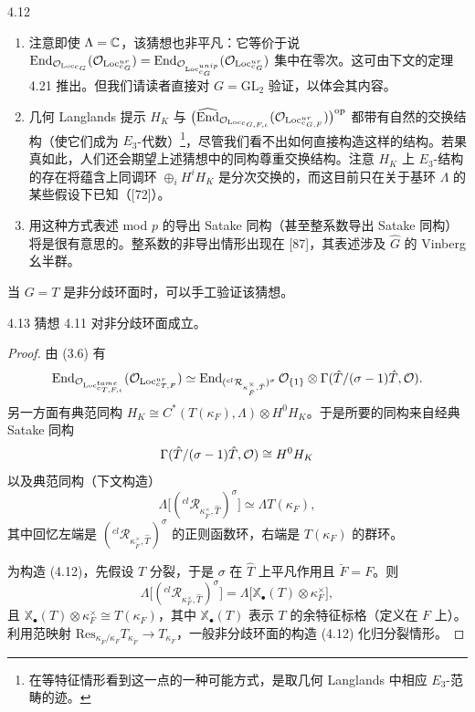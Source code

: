 \begin{rem}{4.12}
\begin{enumerate}[label=(\arabic*),leftmargin=1.8em,itemsep=0.15em]
\item 注意即使 $\Lambda=\mathbb{C}$，该猜想也非平凡：它等价于说
$\operatorname{End}_{\mathcal{O}_{\operatorname{Loc}_{{}^cG}}}(\mathcal{O}_{\operatorname{Loc}^{ur}_{{}^cG}})=\operatorname{End}_{\mathcal{O}_{\operatorname{Loc}^{unip}_{{}^cG}}}(\mathcal{O}_{\operatorname{Loc}^{ur}_{{}^cG}})$ 集中在零次。这可由下文的定理 4.21 推出。但我们请读者直接对 $G=\mathrm{GL}_2$ 验证，以体会其内容。
\item 几何 Langlands 提示 $H_K$ 与 $\big(\widehat{\operatorname{End}}_{\mathcal{O}_{\operatorname{Loc}_{{}^cG,F,\iota}}}(\mathcal{O}_{\operatorname{Loc}^{ur}_{{}^cG,F}})\big)^{\mathrm{op}}$ 都带有自然的交换结构（使它们成为 $E_3$-代数）\footnote{在等特征情形看到这一点的一种可能方式，是取几何 Langlands 中相应 $E_3$-范畴的迹。}，尽管我们看不出如何直接构造这样的结构。若果真如此，人们还会期望上述猜想中的同构尊重交换结构。注意 $H_K$ 上 $E_3$-结构的存在将蕴含上同调环 $\oplus_iH^iH_K$ 是分次交换的，而这目前只在关于基环 $\Lambda$ 的某些假设下已知（[72]）。
\item 用这种方式表述 mod $p$ 的导出 Satake 同构（甚至整系数导出 Satake 同构）将是很有意思的。整系数的非导出情形出现在 [87]，其表述涉及 $\hat G$ 的 Vinberg 幺半群。
\end{enumerate}
\end{rem}

当 $G=T$ 是非分歧环面时，可以手工验证该猜想。

\begin{prop}{4.13}
猜想 4.11 对非分歧环面成立。
\end{prop}

\begin{proof}
由 (3.6) 有
\[
\operatorname{End}_{\mathcal{O}_{\operatorname{Loc}^{tame}_{{}^cT,F,\iota}}}(\mathcal{O}_{\operatorname{Loc}^{ur}_{{}^cT,F}})
\simeq\operatorname{End}_{({}^{cl}\mathcal{R}_{\kappa_{\breve F}^\times,\hat T})^\sigma}\mathcal{O}_{\{1\}}
\otimes\Gamma(\hat T/(\sigma-1)\hat T,\mathcal{O}).
\]
另一方面有典范同构 $H_K\cong C^*(T(\kappa_F),\Lambda)\otimes H^0H_K$。于是所要的同构来自经典 Satake 同构
\[
\Gamma(\hat T/(\sigma-1)\hat T,\mathcal{O})\cong H^0H_K
\]
以及典范同构（下文构造）
\begin{equation}
\tag{4.12}
\Lambda\big[({}^{cl}\mathcal{R}_{\kappa_{\breve F}^\times,\hat T})^\sigma\big]\simeq\Lambda T(\kappa_F),
\end{equation}
其中回忆左端是 $({}^{cl}\mathcal{R}_{\kappa_{\breve F}^\times,\hat T})^\sigma$ 的正则函数环，右端是 $T(\kappa_F)$ 的群环。

为构造 (4.12)，先假设 $T$ 分裂，于是 $\sigma$ 在 $\hat T$ 上平凡作用且 $\breve F=F$。则
\[
\Lambda\big[({}^{cl}\mathcal{R}_{\kappa_F^\times,\hat T})^\sigma\big]=\Lambda\big[\mathbb{X}_\bullet(T)\otimes\kappa_F^\times\big],
\]
且 $\mathbb{X}_\bullet(T)\otimes\kappa_F^\times\cong T(\kappa_F)$，其中 $\mathbb{X}_\bullet(T)$ 表示 $T$ 的余特征标格（定义在 $F$ 上）。利用范映射 $\mathrm{Res}_{\kappa_{\breve F}/\kappa_F}T_{\kappa_{\breve F}}\to T_{\kappa_F}$，一般非分歧环面的构造 (4.12) 化归分裂情形。
\end{proof}

